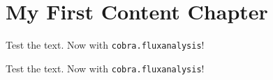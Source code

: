\chapter{My First Content Chapter}
\label{chapter2label}

\blindtext


Test the text. Now with \texttt{cobra.flux\textunderscore analysis}!



Test the text. Now with \texttt{cobra.flux\textunderscore analysis}!